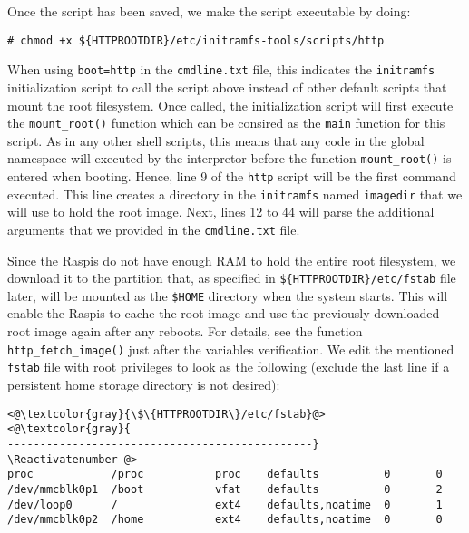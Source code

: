 Once the script has been saved, we make the script executable by doing:
\begin{lstlisting}[]
# chmod +x ${HTTPROOTDIR}/etc/initramfs-tools/scripts/http
\end{lstlisting}
\FloatBarrier
\vspace{-5mm}

When using \texttt{boot=http} in the \texttt{cmdline.txt} file, this
indicates the \texttt{initramfs} initialization script to call the script
above instead of other default scripts that mount the root filesystem.
Once called, the initialization script will first execute the
\texttt{mount\_root()} function which can be consired as the \texttt{main}
function for this script. As in any other shell scripts, this means
that any code in the global namespace will executed by the interpretor
before the function \texttt{mount\_root()} is entered when booting. Hence,
line 9 of the \texttt{http} script will be the first command executed.
This line creates a directory in the \texttt{initramfs} named
\texttt{imagedir} that we will use to hold the root image. Next, lines 12
to 44 will parse the additional arguments that we provided in
the \texttt{cmdline.txt} file.

Since the \ac{Raspi}s do not have enough \ac{RAM} to hold the entire
root filesystem, we download it to the partition that, as specified
in \texttt{\$\{HTTPROOTDIR\}/etc/fstab} file later, will be mounted as the
\texttt{\$HOME} directory when the system starts. This will enable the
\ac{Raspi}s to cache the root image and use the previously downloaded
root image again after any reboots. For details, see the function
\texttt{http\_fetch\_image()} just after the variables verification.
We edit the mentioned \texttt{fstab} file with root privileges to look
as the following (exclude the last line if a persistent home storage
directory is not desired):

\Suppressnumber\begin{lstlisting}[]
<@\textcolor{gray}{\$\{HTTPROOTDIR\}/etc/fstab}@>
<@\textcolor{gray}{
-----------------------------------------------}
\Reactivatenumber @>
proc            /proc           proc    defaults          0       0
/dev/mmcblk0p1  /boot           vfat    defaults          0       2
/dev/loop0      /               ext4    defaults,noatime  0       1
/dev/mmcblk0p2  /home           ext4    defaults,noatime  0       0
\end{lstlisting}
\FloatBarrier
\vspace{-5mm}

